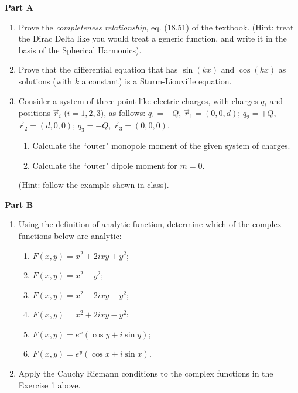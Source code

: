 \documentclass[fleqn]{article}
\begin{document}
  \textbf{Part A}
  \begin{enumerate}

    \item  Prove the \emph{completeness relationship}, eq. (18.51) of the textbook. (Hint: treat the Dirac Delta like you would treat a generic function, and write it in the basis of the Spherical Harmonics). 
    
    
    \item  Prove that the differential equation that has $\sin( k x)$ and $\cos(k x)$ as solutions (with $k$ a constant) is a Sturm-Liouville equation. 
    
    
    \item Consider a system of three point-like electric charges, with charges $q_i$ and positions $\vec r_i$ ($i=1,2,3$), as follows:
    $q_1=+Q$, $\vec r_1=(0,0,d)$; $q_2=+Q$, $\vec r_2=(d,0,0)$; $q_3=-Q$, $\vec r_3=(0,0,0)$.   
    
    \begin{enumerate}
    \item Calculate the ``outer" monopole moment of the given system of charges. 
    
    \item Calculate the ``outer" dipole moment for $m=0$. 
    
    
    \end{enumerate}
    (Hint: follow the example shown in class). 
    
  \end{enumerate}

  \textbf{Part B}
  \begin{enumerate}

    \item Using the definition of analytic function, determine which of the complex functions below are analytic: 
    
    \begin{enumerate}
      \item $F(x,y)=x^2+2ixy+y^2$;
      \item  $F(x,y)=x^2-y^2$;
      \item  $F(x,y)=x^2-2ixy-y^2$;
      \item  $F(x,y)=x^2+2ixy-y^2$;
      \item  $F(x,y)=e^x(\cos y+i \sin y)$;
      \item  $F(x,y)=e^y(\cos x+i \sin x)$.
    \end{enumerate}
    
    \item Apply the Cauchy Riemann conditions to the complex functions in the Exercise 1 above.
    
    
  \end{enumerate}
\end{document}
